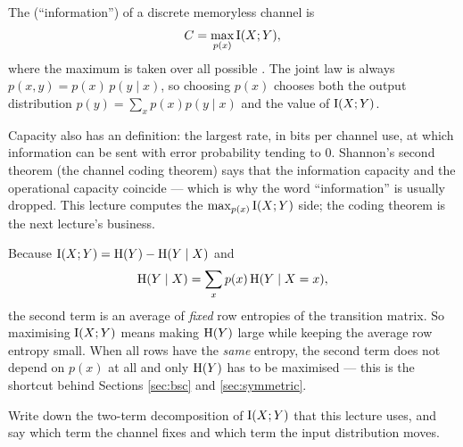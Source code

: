 
\begin{definition}\label{def:information-capacity}
The (``information'')  of a discrete memoryless
channel is
\[
  C=\max_{p(x)}\mathrm{I}(X;Y),
\]
where the maximum is taken over all possible
.
The joint law is always $p(x,y)=p(x)\,p(y\mid x)$, so choosing $p(x)$ chooses
both the output distribution $p(y)=\sum_xp(x)p(y\mid x)$ and the value of
$\mathrm{I}(X;Y)$.
\end{definition}

\begin{remark}
Capacity also has an  definition: the largest rate, in bits
per channel use, at which information can be sent with error probability tending
to $0$. Shannon's second theorem (the channel coding theorem) says that the
information capacity and the operational capacity coincide --- which is why the
word ``information'' is usually dropped. This lecture computes the
$\max_{p(x)}\mathrm{I}(X;Y)$ side; the coding theorem is the next lecture's business.
\end{remark}


Because $\mathrm{I}(X;Y)=\mathrm{H}(Y)-\mathrm{H}(Y\mid X)$ and
\[
  \mathrm{H}(Y\mid X)=\sum_{x}p(x)\,\mathrm{H}(Y\mid X=x),
\]
the second term is an average of \emph{fixed} row entropies of the transition
matrix. So maximising $\mathrm{I}(X;Y)$ means making $\mathrm{H}(Y)$ large while keeping the
average row entropy small. When all rows have the \emph{same} entropy, the
second term does not depend on $p(x)$ at all and only $\mathrm{H}(Y)$ has to be
maximised --- this is the shortcut behind Sections \ref{sec:bsc} and
\ref{sec:symmetric}.

\begin{yourturn}
Write down the two-term decomposition of $\mathrm{I}(X;Y)$ that this lecture uses, and
say which term the channel fixes and which term the input distribution moves.
\ifshowanswers\else\workspace[2]\fi
{}
\end{yourturn}

